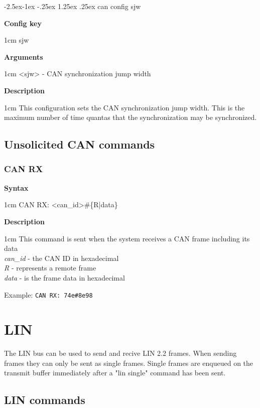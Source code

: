 \documentclass{article}[a4paper]
\makeatletter
\newcommand\subsubsubsection{\@startsection{paragraph}{4}{\z@}%
            {-2.5ex\@plus -1ex \@minus -.25ex}%
            {1.25ex \@plus .25ex}%
            {\normalfont\normalsize\bfseries}}
\makeatother
\begin{document}
\subsubsubsection{can config sjw}
\begin{tcolorbox}
	{\bf Config key}

	 1cm \dimexpr\linewidth-2cm\relax
	sjw

	\medskip
	{\bf Arguments}

	 1cm \dimexpr\linewidth-2cm\relax
	<sjw> - CAN synchronization jump width

	\medskip
	{\bf Description}

	 1cm \dimexpr\linewidth-2cm\relax
	This configuration sets the CAN synchronization jump width. This is the
	maximum number of time quantas that the synchronization may be synchronized.
\end{tcolorbox}

\subsection{Unsolicited CAN commands}

\subsubsection{CAN RX}
\begin{tcolorbox}
	{\bf Syntax}

	 1cm \dimexpr\linewidth-2cm\relax
	CAN RX: <can\_id>\#\{R|data\}

	\medskip
	{\bf Description}

	 1cm \dimexpr\linewidth-2cm\relax
	This command is sent when the system receives a CAN frame including its data
	\medskip \\
	{\it can\_id} - the CAN ID in hexadecimal \\
	{\it R} - represents a remote frame \\
	{\it data} - is the frame data in hexadecimal

	\medskip
	Example: \texttt{CAN RX: 74e\#8e98}
\end{tcolorbox}

\section{LIN}

The LIN bus can be used to send and recive LIN 2.2 frames.
When sending frames they can only be sent as single frames. Single frames are
enqueued on the transmit buffer immediately after a "lin single" command has been sent.


\subsection{LIN commands}
\end{document}
